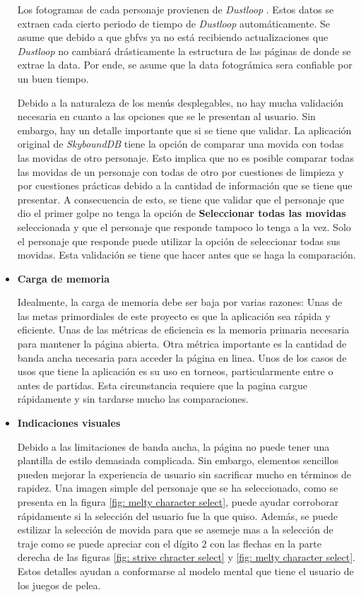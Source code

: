 \begin{itemize}
    Los fotogramas de cada personaje provienen de \textit{Dustloop} \cite{noauthor_granblue_2022-1}. Estos datos se extraen cada cierto periodo de tiempo de \textit{Dustloop} automáticamente. Se asume que debido a que \gls{gbfvs} ya no está recibiendo actualizaciones que \textit{Dustloop} no cambiará drásticamente la estructura de las páginas de donde se extrae la data. Por ende, se asume que la data fotográmica sera confiable por un buen tiempo.

    Debido a la naturaleza de los menús desplegables, no hay mucha validación necesaria en cuanto a las opciones que se le presentan al usuario. Sin embargo, hay un detalle importante que si se tiene que validar. La aplicación original de \textit{SkyboundDB} tiene la opción de comparar una movida con todas las movidas de otro personaje. Esto implica que no es posible comparar todas las movidas de un personaje con todas de otro por cuestiones de limpieza y por cuestiones prácticas debido a la cantidad de información que se tiene que presentar. A consecuencia de esto, se tiene que validar que el personaje que dio el primer golpe no tenga la opción de \textbf{Seleccionar todas las movidas} seleccionada y que el personaje que responde tampoco lo tenga a la vez. Solo el personaje que responde puede utilizar la opción de seleccionar todas sus movidas. Esta validación se tiene que hacer antes que se haga la comparación.
    \item \textbf{Carga de memoria}
    
    Idealmente, la carga de memoria debe ser baja por varias razones: Unas de las metas primordiales de este proyecto es que la aplicación sea rápida y eficiente. Unas de las métricas de eficiencia es la memoria primaria necesaria para mantener la página abierta. Otra métrica importante es la cantidad de banda ancha necesaria para acceder la página en linea. Unos de los casos de usos que tiene la aplicación es su uso en torneos, particularmente entre o antes de partidas. Esta circunstancia requiere que la pagina cargue rápidamente y sin tardarse mucho las comparaciones.  

    \item \textbf{Indicaciones visuales}
    
    Debido a las limitaciones de banda ancha, la página no puede tener una plantilla de estilo demasiada complicada. Sin embargo, elementos sencillos pueden mejorar la experiencia de usuario sin sacrificar mucho en términos de rapidez. Una imagen simple del personaje que se ha seleccionado, como se presenta en la figura \ref{fig: melty character select}, puede ayudar corroborar rápidamente si la selección del usuario fue la que quiso. Además, se puede estilizar la selección de movida para que se asemeje mas a la selección de traje como se puede apreciar con el dígito $2$ con las flechas en la parte derecha de las figuras \ref{fig: strive chracter select} y \ref{fig: melty character select}. Estos detalles ayudan a conformarse al modelo mental que tiene el usuario de los juegos de pelea.
\end{itemize}